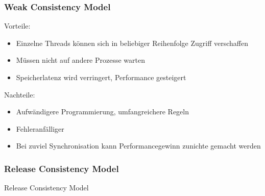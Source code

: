 \documentclass{sikslides}
\begin{document}
\begin{frame}
	\frametitle{Weak Consistency Model}
Vorteile:
	\begin{itemize}
		\item Einzelne Threads können sich in beliebiger Reihenfolge Zugriff verschaffen
		\item Müssen nicht auf andere Prozesse warten
		\item Speicherlatenz wird verringert, Performance gesteigert
	\end{itemize}
\bigskip
Nachteile:
	\begin{itemize}
		\item Aufwändigere Programmierung, umfangreichere Regeln
		\item Fehleranfälliger
		\item Bei zuviel Synchronisation kann Performancegewinn zunichte gemacht werden
	\end{itemize}
\end{frame}


\begin{frame}
	\frametitle{Release Consistency Model}
Release Consistency Model
\end{frame}
\end{document}
